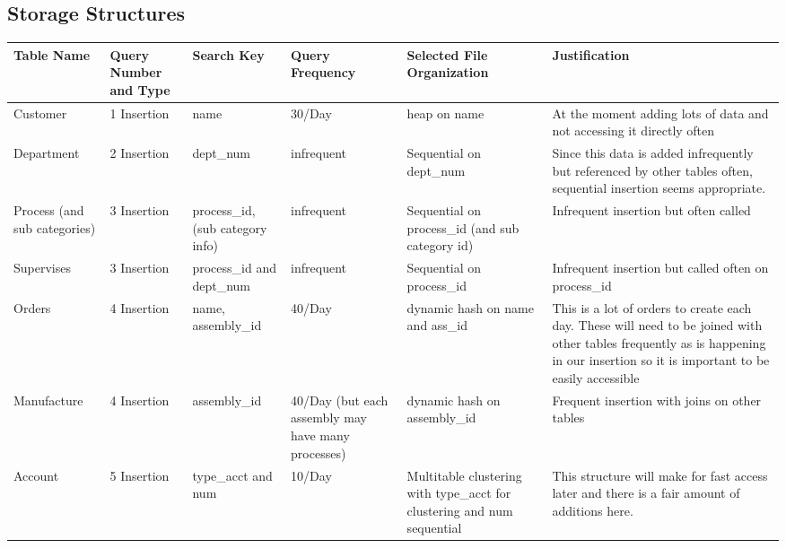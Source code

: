 \documentclass[11pt]{article}
\begin{document}
\subsection{Storage Structures}
\begin{tabular}{|p{.75in}|p{.75in}|p{.75in}|p{.65in}|p{.75in}|p{1.75in}|}\hline
Table Name & Query Number and Type & Search Key& Query Frequency& Selected File Organization & Justification\\ \hline\hline
Customer & 1 Insertion & name & 30/Day & heap on name & At the moment adding lots of data and not accessing it directly often\\ \hline 
Department & 2 Insertion& dept\_num & infrequent & Sequential on dept\_num & Since this data is added infrequently but referenced by other tables often, sequential insertion seems appropriate.\\ \hline
Process (and sub categories)& 3 Insertion & process\_id,  (sub category info) & infrequent & Sequential on process\_id (and sub category id)&  Infrequent insertion but often called\\ \hline
Supervises & 3 Insertion & process\_id and dept\_num & infrequent & Sequential on process\_id &Infrequent insertion but called often on process\_id\\\hline
Orders & 4 Insertion & name, assembly\_id& 40/Day&dynamic hash on name and ass\_id& This is a lot of orders to create each day.  These will need to be joined with other tables frequently as is happening in our insertion so it is important to be easily accessible  \\ \hline
Manufacture  & 4 Insertion & assembly\_id &40/Day (but each assembly may have many processes) &dynamic hash on assembly\_id & Frequent insertion with joins on other tables            \\ \hline
Account & 5 Insertion & type\_acct and num & 10/Day & Multitable clustering with type\_acct for clustering and num sequential& This structure will make for fast access later and there is a fair amount of additions here.\\ \hline
\end{tabular}
\newpage
\end{document}
